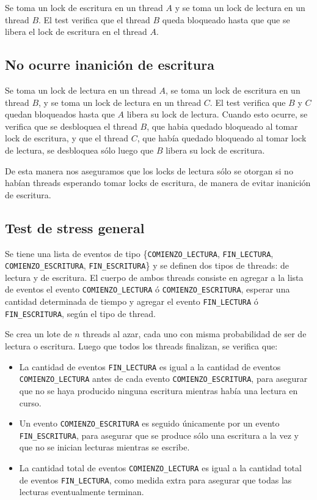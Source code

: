 \documentclass[a4paper,10pt,twoside]{article}
\begin{document}
Se toma un lock de escritura en un thread $A$ y se toma un lock de lectura en un thread $B$. El test verifica que el thread $B$ queda bloqueado hasta que que se libera el lock de escritura en el thread $A$.


\subsection{No ocurre inanición de escritura}

Se toma un lock de lectura en un thread $A$, se toma un lock de escritura en un thread $B$, y se toma un lock de lectura en un thread $C$. El test verifica que $B$ y $C$ quedan bloqueados hasta que $A$ libera su lock de lectura. Cuando esto ocurre, se verifica que se desbloquea el thread $B$, que habia quedado bloqueado al tomar lock de escritura, y que el thread $C$, que había quedado bloqueado al tomar lock de lectura, se desbloquea sólo luego que $B$ libera su lock de escritura.

De esta manera nos aseguramos que los locks de lectura sólo se otorgan si no habían threads esperando tomar locks de escritura, de manera de evitar inanición de escritura.


\subsection{Test de stress general}

Se tiene una lista de eventos de tipo \{\texttt{COMIENZO\_LECTURA}, \texttt{FIN\_LECTURA}, \texttt{COMIENZO\_ESCRITURA}, \texttt{FIN\_ESCRITURA}\} y se definen dos tipos de threads: de lectura y de escritura. El cuerpo de ambos threads consiste en agregar a la lista de eventos el evento \texttt{COMIENZO\_LECTURA} ó \texttt{COMIENZO\_ESCRITURA}, esperar una cantidad determinada de tiempo y agregar el evento \texttt{FIN\_LECTURA} ó \texttt{FIN\_ESCRITURA}, según el tipo de thread.

Se crea un lote de $n$ threads al azar, cada uno con misma probabilidad de ser de lectura o escritura. Luego que todos los threads finalizan, se verifica que:

\begin{itemize}
    \item La cantidad de eventos \texttt{FIN\_LECTURA} es igual a la cantidad de eventos \texttt{COMIENZO\_LECTURA} antes de cada evento \texttt{COMIENZO\_ESCRITURA}, para asegurar que no se haya producido ninguna escritura mientras había una lectura en curso.
    
    \item Un evento \texttt{COMIENZO\_ESCRITURA} es seguido únicamente por un evento \texttt{FIN\_ESCRITURA}, para asegurar que se produce sólo una escritura a la vez y que no se inician lecturas mientras se escribe.

    \item La cantidad total de eventos \texttt{COMIENZO\_LECTURA} es igual a la cantidad total de eventos \texttt{FIN\_LECTURA}, como medida extra para asegurar que todas las lecturas eventualmente terminan.
\end{itemize}
\end{document}
